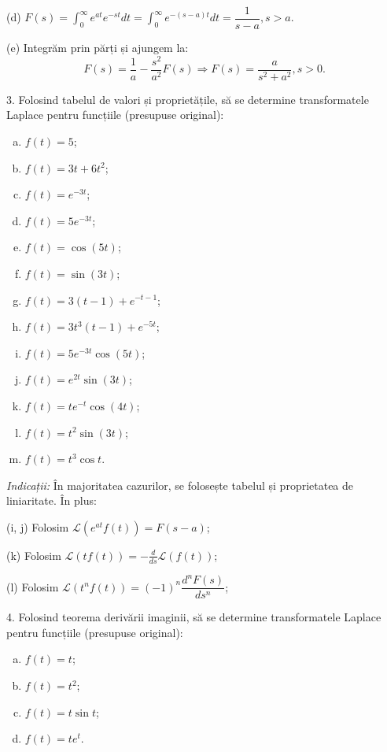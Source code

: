 \documentclass[12pt,a4paper]{article}
\newcommand\ds{\displaystyle}
\newcommand\Lap{\mathcal{L}}
\theoremstyle{dotless}
\theoremstyle{dotlessdr}
\begin{document}
(d) $ F(s) = \ds\int_0^\infty e^{at} e^{-st} dt = \ds\int_0^\infty e^{-(s - a)t} dt = %
\dfrac{1}{s-a}, s > a $.

(e) Integrăm prin părți și ajungem la:
\[
  F(s) = \frac{1}{a} - \frac{s^2}{a^2} F(s) \Rightarrow F(s) = \frac{a}{s^2 + a^2}, s > 0.
\]

\vspace{1cm}

3. Folosind tabelul de valori și proprietățile, să se determine transformatele Laplace
pentru funcțiile (presupuse original):
\begin{enumerate}[(a)]
\item $ f(t) = 5 $;
\item $ f(t) = 3t + 6t^2 $;
\item $ f(t) = e^{-3t} $;
\item $ f(t) = 5e^{-3t} $;
\item $ f(t) = \cos (5t) $;
\item $ f(t) = \sin (3t) $;
\item $ f(t) = 3(t-1) + e^{-t-1} $;
\item $ f(t) = 3t^3(t - 1) + e^{-5t} $;
\item $ f(t) = 5e^{-3t} \cos (5t) $;
\item $ f(t) = e^{2t} \sin (3t) $;
\item $ f(t) = te^{-t} \cos (4t) $;
\item $ f(t) = t^2 \sin (3t) $;
\item $ f(t) = t^3 \cos t $.
\end{enumerate}

\emph{Indicații:} În majoritatea cazurilor, se folosește tabelul și proprietatea de liniaritate.
În plus:

(i, j) Folosim $ \Lap (e^{at} f(t)) = F(s - a) $;

(k) Folosim $ \Lap (t f(t)) = -\frac{d}{ds} \Lap(f(t)) $;

(l) Folosim $ \Lap(t^n f(t)) = (-1)^n \dfrac{d^n F(s)}{ds^n} $;

\vspace{1cm}

4. Folosind teorema derivării imaginii, să se determine transformatele Laplace pentru funcțiile
(presupuse original):
\begin{enumerate}[(a)]
\item $ f(t) = t $;
\item $ f(t) = t^2 $;
\item $ f(t) = t\sin t $;
\item $ f(t) = te^t $.
\end{enumerate}
\end{document}
